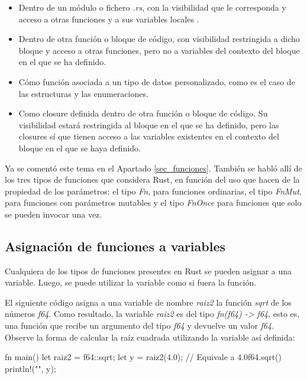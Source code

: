 \begin{itemize}
   \item Dentro de un módulo o fichero \textit{.rs}, con la visibilidad que le corresponda y acceso a otras funciones y a sus variables locales .
   \item Dentro de otra función o bloque de código, con visibilidad restringida a dicho bloque y acceso a otras funciones, pero no a variables del contexto del bloque en el que se ha definido.
   \item Cómo función asociada a un tipo de datos personalizado, como es el caso de las estructuras y las enumeraciones.
   \item Como closure definida dentro de otra función o bloque de código. Su visibilidad estará restringida al bloque en el que se ha definido, pero las closures sí que tienen acceso a las variables existentes en el contexto del bloque en el que se haya definido. 
\end{itemize}

Ya se comentó este tema en el Apartado \ref{sec_funciones}. También se habló allí de los tres tipos de funciones que considera Rust, en función del uso que hacen de la propiedad de los parámetros: el tipo \textit{Fn}, para funciones ordinarias, el tipo \textit{FnMut}, para funciones con parámetros mutables y el tipo \textit{FnOnce} para funciones que solo se pueden invocar una vez.

\subsection{Asignación de funciones a variables}
Cualquiera de los tipos de funciones presentes en Rust se pueden asignar a una variable. Luego, se puede utilizar la variable como si fuera la función. 

El siguiente código asigna a una variable de nombre \textit{raiz2} la función \textit{sqrt} de los números \textit{f64}. Como resultado, la variable \textit{raiz2} es del tipo \textit{fn(f64) -> f64}, esto es, una función que recibe un argumento del tipo \textit{f64} y devuelve un valor \textit{f64}. Observe la forma de calcular la raíz cuadrada utilizando la variable así definida:

\vspace{0.7em}
\begin{Codigo}
fn main() {
   let raiz2  = f64::sqrt;
   let y = raiz2(4.0); // Equivale a 4.0f64.sqrt()
   println!("{}", y);
}
\end{Codigo}

